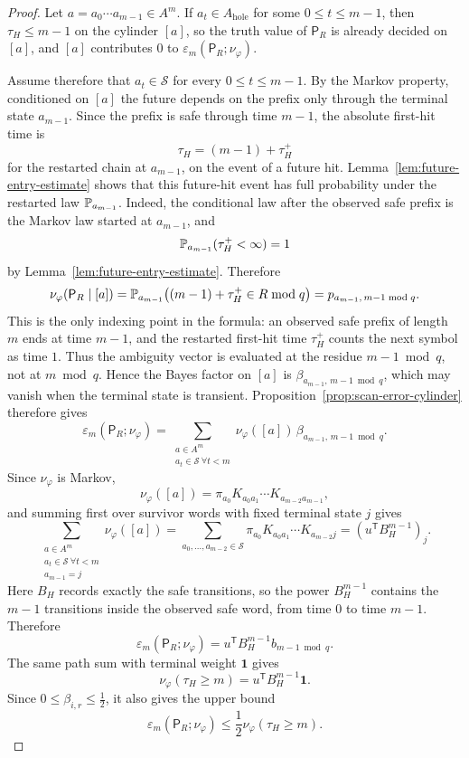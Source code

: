 \begin{proof}
Let \(a=a_0\cdots a_{m-1}\in A^m\).  If \(a_t\in A_{\mathrm{hole}}\) for some
\(0\leq t\leq m-1\), then \(\tau_H\leq m-1\) on the cylinder \([a]\), so
the truth value of \(\mathsf{P}_R\) is already decided on \([a]\), and
\([a]\) contributes \(0\) to
\(\varepsilon_m(\mathsf{P}_R;\nu_\varphi)\).

Assume therefore that \(a_t\in\mathcal S\) for every
\(0\leq t\leq m-1\).  By the Markov property, conditioned on \([a]\) the
future depends on the prefix only through the terminal state
\(a_{m-1}\).  Since the prefix is safe through time \(m-1\), the
absolute first-hit time is
\[
  \tau_H=(m-1)+\tau_H^+
\]
for the restarted chain at \(a_{m-1}\), on the event of a future hit.
Lemma~\ref{lem:future-entry-estimate} shows that this future-hit event
has full probability under the restarted law \(\mathbb{P}_{a_{m-1}}\).  Indeed,
the conditional law after the observed safe prefix is the Markov law
started at \(a_{m-1}\), and
\[
  \mathbb{P}_{a_{m-1}}(\tau_H^+<\infty)=1
\]
by Lemma~\ref{lem:future-entry-estimate}.
Therefore
\[
  \nu_\varphi(\mathsf P_R\mid[a])
  =
  \mathbb{P}_{a_{m-1}}\bigl((m-1)+\tau_H^+\in R\bmod q\bigr)
  =
  p_{a_{m-1},\,m-1\bmod q}.
\]
This is the only indexing point in the formula: an observed safe prefix
of length \(m\) ends at time \(m-1\), and the restarted first-hit time
\(\tau_H^+\) counts the next symbol as time \(1\).  Thus the ambiguity
vector is evaluated at the residue \(m-1\bmod q\), not at \(m\bmod q\).
Hence the Bayes factor on \([a]\) is
\(\beta_{a_{m-1},\,m-1\bmod q}\), which may vanish when the terminal
state is transient.  Proposition~\ref{prop:scan-error-cylinder} therefore
gives
\[
  \varepsilon_m(\mathsf{P}_R;\nu_\varphi)
  = \sum_{\substack{a\in A^m\\ a_t\in\mathcal S\ \forall t<m}}
      \nu_\varphi([a])\,
      \beta_{a_{m-1},\,m-1\bmod q}.
\]
Since \(\nu_\varphi\) is Markov,
\[
  \nu_\varphi([a])
  = \pi_{a_0}K_{a_0a_1}\cdots K_{a_{m-2}a_{m-1}},
\]
and summing first over survivor words with fixed terminal state \(j\)
gives
\[
  \sum_{\substack{a\in A^m\\
                  a_t\in\mathcal S\ \forall t<m\\
                  a_{m-1}=j}}
      \nu_\varphi([a])
  =
  \sum_{a_0,\ldots,a_{m-2}\in\mathcal S}
      \pi_{a_0}K_{a_0a_1}\cdots K_{a_{m-2}j}
  =
  (u^{\mathsf T}B_H^{m-1})_j .
\]
Here \(B_H\) records exactly the safe transitions, so the power
\(B_H^{m-1}\) contains the \(m-1\) transitions inside the observed safe
word, from time \(0\) to time \(m-1\).
Therefore
\[
  \varepsilon_m(\mathsf{P}_R;\nu_\varphi)
  = u^{\mathsf T}B_H^{m-1}b_{m-1\bmod q}.
\]
The same path sum with terminal weight \(\mathbf{1}\) gives
\[
  \nu_\varphi(\tau_H\geq m)
  = u^{\mathsf T}B_H^{m-1}\mathbf{1}.
\]
Since \(0\leq\beta_{i,r}\leq\frac12\), it also gives the upper bound
\[
  \varepsilon_m(\mathsf P_R;\nu_\varphi)
  \leq \frac12\nu_\varphi(\tau_H\geq m).
\]


\end{proof}
